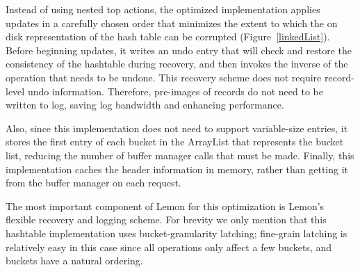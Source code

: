 \documentclass[letterpaper,twocolumn,english]{article}
\newcommand{\yad}{Lemon\xspace}
\begin{document}
Instead of using nested top actions, the optimized implementation
applies updates in a carefully chosen order that minimizes the extent
to which the on disk representation of the hash table can be
corrupted (Figure~\ref{linkedList}). Before beginning updates, it
writes an undo entry that will check and restore the consistency of
the hashtable during recovery, and then invokes the inverse of the
operation that needs to be undone.  This recovery scheme does not
require record-level undo information.  Therefore, pre-images of
records do not need to be written to log, saving log bandwidth and
enhancing performance.

Also, since this implementation does not need to support variable-size
entries, it stores the first entry of each bucket in the ArrayList
that represents the bucket list, reducing the number of buffer manager
calls that must be made.  Finally, this implementation caches
the header information in memory, rather than getting it from the buffer manager on each request.

The most important component of \yad for this optimization is \yad's
flexible recovery and logging scheme.  For brevity we only mention
that this hashtable implementation uses bucket-granularity latching;
fine-grain latching is relatively easy in this case since all
operations only affect a few buckets, and buckets have a natural
ordering.
\end{document}
